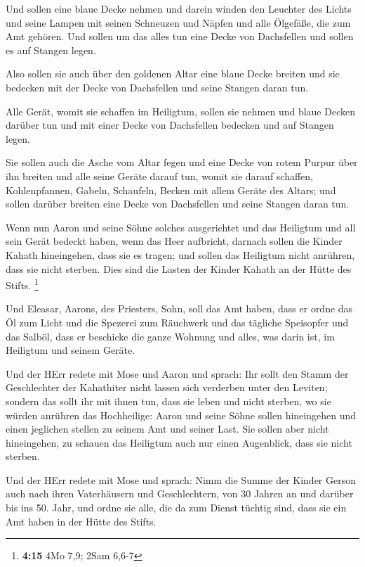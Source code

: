  Und sollen eine blaue Decke nehmen und darein winden den
Leuchter des Lichts und seine Lampen mit seinen Schneuzen und Näpfen und
alle Ölgefäße, die zum Amt gehören.  Und sollen um das
alles tun eine Decke von Dachsfellen und sollen es auf Stangen legen.

 Also sollen sie auch über den goldenen Altar eine blaue
Decke breiten und sie bedecken mit der Decke von Dachsfellen und seine
Stangen daran tun.

 Alle Gerät, womit sie schaffen im Heiligtum, sollen sie
nehmen und blaue Decken darüber tun und mit einer Decke von Dachsfellen
bedecken und auf Stangen legen.

 Sie sollen auch die Asche vom Altar fegen und eine Decke
von rotem Purpur über ihn breiten  und alle seine Geräte
darauf tun, womit sie darauf schaffen, Kohlenpfannen, Gabeln, Schaufeln,
Becken mit allem Geräte des Altars; und sollen darüber breiten eine
Decke von Dachsfellen und seine Stangen daran tun.

 Wenn nun Aaron und seine Söhne solches ausgerichtet und
das Heiligtum und all sein Gerät bedeckt haben, wenn das Heer aufbricht,
darnach sollen die Kinder Kahath hineingehen, dass sie es tragen; und
sollen das Heiligtum nicht anrühren, dass sie nicht sterben. Dies sind
die Lasten der Kinder Kahath an der Hütte des Stifts. \footnote{\textbf{4:15}
  4Mo 7,9; 2Sam 6,6-7}

 Und Eleasar, Aarons, des Priesters, Sohn, soll das Amt
haben, dass er ordne das Öl zum Licht und die Spezerei zum Räuchwerk und
das tägliche Speisopfer und das Salböl, dass er beschicke die ganze
Wohnung und alles, was darin ist, im Heiligtum und seinem Geräte.

 Und der HErr redete mit Mose und Aaron und sprach:
 Ihr sollt den Stamm der Geschlechter der Kahathiter
nicht lassen sich verderben unter den Leviten;  sondern
das sollt ihr mit ihnen tun, dass sie leben und nicht sterben, wo sie
würden anrühren das Hochheilige: Aaron und seine Söhne sollen
hineingehen und einen jeglichen stellen zu seinem Amt und seiner Last.
 Sie sollen aber nicht hineingehen, zu schauen das
Heiligtum auch nur einen Augenblick, dass sie nicht sterben.

 Und der HErr redete mit Mose und sprach: 
Nimm die Summe der Kinder Gerson auch nach ihren Vaterhäusern und
Geschlechtern,  von 30 Jahren an und darüber bis ins 50.
Jahr, und ordne sie alle, die da zum Dienst tüchtig sind, dass sie ein
Amt haben in der Hütte des Stifts.

